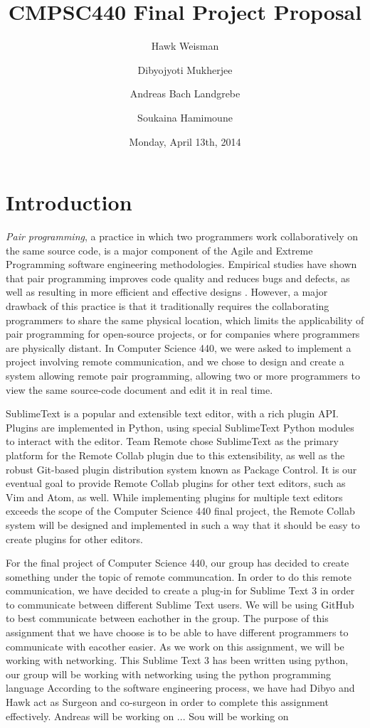 \documentclass[11pt,english]{article}
\date{Monday, April 13th, 2014}
\title{CMPSC440 Final Project Proposal}
\author[1]{Hawk Weisman}
\author[1]{Dibyojyoti Mukherjee}
\author[1]{Andreas Bach Landgrebe}
\author[2]{Soukaina Hamimoune}
\affil[1]{Allegheny College, Department of Computer Science}
\affil[2]{Al Akhawayn University, Department of Computer Science}
\begin{document}
\maketitle
\section{Introduction}
	\textit{Pair programming}, a practice in which two programmers work collaboratively on the same source code, is a major component of the Agile and Extreme Programming software engineering methodologies. Empirical studies have shown that pair programming improves code quality and reduces bugs and defects, as well as resulting in more efficient and effective designs \cite{cockburn2000costs}. However, a major drawback of this practice is that it traditionally requires the collaborating programmers to share the same physical location, which limits the applicability of pair programming for open-source projects, or for companies where programmers are physically distant. In Computer Science 440, we were asked to implement a project involving remote communication, and we chose to design and create a system allowing remote pair programming, allowing two or more programmers to view the same source-code document and edit it in real time.

	SublimeText is a popular and extensible text editor, with a rich plugin API. Plugins are implemented in Python, using special SublimeText Python modules to interact with the editor. Team Remote chose SublimeText as the primary platform for the Remote Collab plugin due to this extensibility, as well as the robust Git-based plugin distribution system known as Package Control. It is our eventual goal to provide Remote Collab plugins for other text editors, such as Vim and Atom, as well. While implementing plugins for multiple text editors exceeds the scope of the Computer Science 440 final project, the Remote Collab system will be designed and implemented in such a way that it should be easy to create plugins for other editors.

For the final project of Computer Science 440, our group has decided to create something under the topic of remote communcation. In order to do this remote communication, we have decided to create a plug-in for Sublime Text 3 in order to communicate between different Sublime Text users. We will be using GitHub to best communicate between eachother in the group. The purpose of this assignment that we have choose is to be able to have different programmers to communicate with eacother easier. As we work on this assignment, we will be working with networking. This Sublime Text 3 has been written using python, our group will be working with networking using the python programming language According to the software engineering process, we have had Dibyo and Hawk act as Surgeon and co-surgeon in order to complete this assignment effectively. Andreas will be working on ... Sou will be working on
\end{document}
